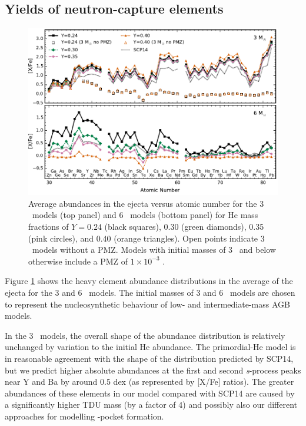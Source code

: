 \subsection{Yields of neutron-capture elements}\label{sec:resultsheavyelements}
\begin{figure}
 \begin{center}\includegraphics[width=200mm]{fig-yieldsm3m6.pdf}\end{center}
 \caption{Average abundances in the ejecta versus atomic number for the 3 \Msun\ models (top panel) and 6 \Msun\ models (bottom panel) for He mass fractions of $Y= 0.24$ (black squares), 0.30 (green diamonds), 0.35 (pink circles), and 0.40 (orange triangles). Open points indicate 3 \Msun\ models without a PMZ. Models with initial masses of 3 \Msun\ and below otherwise include a PMZ of $1\times10^{-3}$ \Msun.}\label{fig:yieldsm3m6}
\end{figure}

Figure \ref{fig:yieldsm3m6} shows the heavy element abundance distributions in the average of the ejecta for the 3 and 6 \Msun\ models. The initial masses of 3 and 6 \Msun\ models are chosen to represent the nucleosynthetic behaviour of low- and intermediate-mass AGB models.

In the 3 \Msun\ models, the overall shape of the abundance distribution is relatively unchanged by variation to the initial He abundance. The primordial-He model is in reasonable agreement with the shape of the distribution predicted by SCP14, but we predict higher absolute abundances at the first and second \textit{s}-process peaks near Y and Ba by around 0.5 dex (as represented by [X/Fe] ratios). The greater abundances of these elements in our model compared with SCP14 are caused by a significantly higher TDU mass (by a factor of 4) and possibly also our different approaches for modelling -pocket formation.

